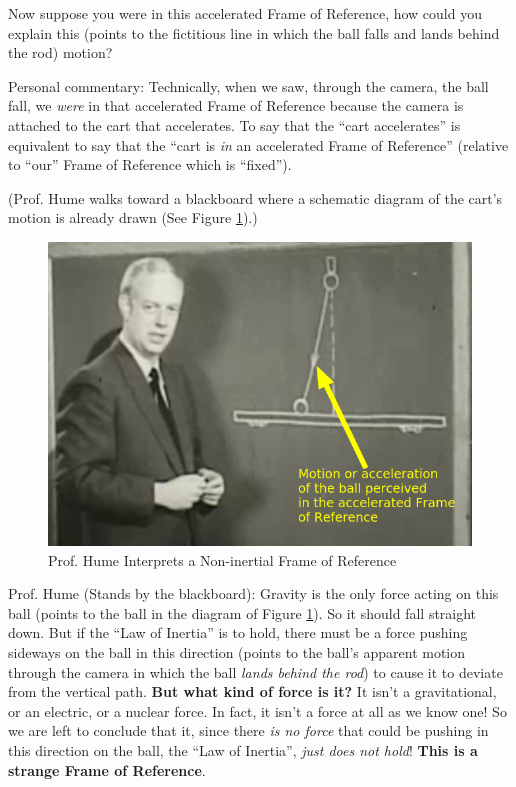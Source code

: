 \documentclass[a6paper]{article}
\begin{document}
Now suppose you were in this accelerated Frame of Reference, how could you explain this (points to the fictitious line in which the ball falls and lands behind the rod) motion?

Personal commentary: Technically, when we saw, through the camera, the ball fall, we \emph{were} in that accelerated Frame of Reference because the camera is attached to the cart that accelerates. To say that the ``cart accelerates'' is equivalent to say that the ``cart is \emph{in} an accelerated Frame of Reference'' (relative to ``our'' Frame of Reference which is ``fixed'').

(Prof. Hume walks toward a blackboard where a schematic diagram of the cart's motion is already drawn (See Figure \ref{fig: prof-hume-interprets-non-inertial-frame}).)

        \begin{figure}[h!]
            \centering
            \includegraphics[width=0.5\linewidth]{prof-hume-interprets-non-inertial-frame.png}
            \caption{Prof. Hume Interprets a Non-inertial Frame of Reference}
            \label{fig: prof-hume-interprets-non-inertial-frame}
        \end{figure}

Prof. Hume (Stands by the blackboard): Gravity is the only force acting on this ball (points to the ball in the diagram of Figure \ref{fig: prof-hume-interprets-non-inertial-frame}). So it should fall straight down. But if the ``Law of Inertia'' is to hold, there must be a force pushing sideways on the ball in this direction (points to the ball's apparent motion through the camera in which the ball \emph{lands behind the rod}) to cause it to deviate from the vertical path. \textbf{But what kind of force is it?} It isn't a gravitational, or an electric, or a nuclear force. In fact, it isn't a force at all as we know one! So we are left to conclude that it, since there \emph{is no force} that could be pushing in this direction on the ball, the ``Law of Inertia'', \emph{just does not hold}! \textbf {This is a strange Frame of Reference}. 
\end{document}
